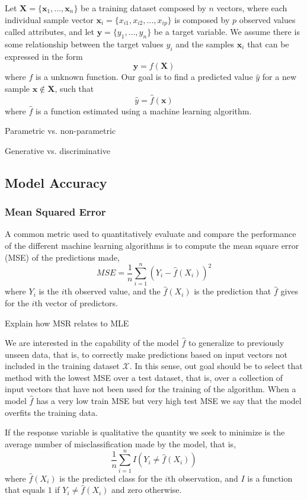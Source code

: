 Let $\mathbf{X} = \{ \mathbf{x}_1, \ldots, \mathbf{x}_n \}$ be a training dataset composed by $n$ vectors, where each individual sample vector $\mathbf{x}_i = \{ x_{i1}, x_{i2}, \ldots, x_{ip} \}$ is composed by $p$ observed values called attributes, and let $\mathbf{y} = \{ y_1, \ldots, y_n \}$ be a target variable. We assume there is some relationship between the target values $y_i$ and the samples $\mathbf{x}_i$ that can be expressed in the form
\[
\mathbf{y} = f\left( \mathbf{X} \right)
\]
where $f$ is a unknown function. Our goal is to find a predicted value $\hat{y}$ for a new sample $\mathbf{x} \notin \mathbf{X}$, such that
\[
\hat{y} = \hat{f} \left( \mathbf{x} \right)
\]
where $\hat{f}$ is a function estimated using a machine learning algorithm.

{\color{red} Parametric vs. non-parametric}

{\color{red} Generative vs. discriminative}

\subsection{Model Accuracy}


\subsubsection{Mean Squared Error}

A common metric used to quantitatively evaluate and compare the performance of the different machine learning algorithms is to compute the mean square error (MSE) of the predictions made, 
\[
MSE = \frac{1}{n} \sum_{i=1}^n \left( Y_i - \hat{f}(X_i) \right) ^ 2
\]
where $Y_i$ is the $i$th observed value, and the $\hat{f}(X_i)$ is the prediction that $\hat{f}$ gives for the $i$th vector of predictors.

{\color{red} Explain how MSR relates to MLE}

We are interested in the capability of the model $\hat{f}$ to generalize to previously unseen data, that is, to correctly make predictions based on input vectors not included in the training dataset $\mathcal{X}$. In this sense, out goal should be to select that method with the lowest MSE over a test dataset, that is, over a collection of input vectors that have not been used for the training of the algorithm. When a model $\hat{f}$ has a very low train MSE but very high test MSE we say that the model overfits the training data.

If the response variable is qualitative the quantity we seek to minimize is the average number of misclassification made by the model, that is,
\[
\frac{1}{n} \sum_{i=1}^n I \left( Y_i \neq \hat{f}(X_i) \right)
\]
where $\hat{f}(X_i)$ is the predicted class for the $i$th observation, and $I$ is a function that equals $1$ if $Y_i \neq \hat{f}(X_i)$ and zero otherwise.

